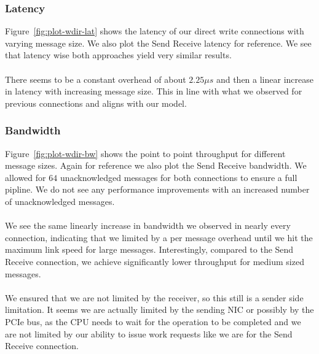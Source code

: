 \subsubsection{Latency}

Figure~\ref{fig:plot-wdir-lat} shows the latency of our direct write connections with varying message size. We
also plot the Send Receive latency for reference. We see that latency wise both approaches yield very similar results.

\paragraph{} There seems to be a constant overhead of about $2.25 \mu s$ and then a linear increase in latency with 
increasing message size. This in line with what we observed for previous connections and aligns with our model.

\subsubsection{Bandwidth}

Figure~\ref{fig:plot-wdir-bw} shows the point to point throughput for different message sizes. Again for reference we also
plot the Send Receive bandwidth. We allowed for $64$ unacknowledged messages for both connections to ensure a full pipline.
We do not see any performance improvements with an increased number of unacknowledged messages.

\paragraph{} We see the same linearly increase in bandwidth we observed in nearly every connection, indicating that we limited
by a per message overhead until we hit the maximum link speed for large messages. Interestingly, compared to the Send Receive
connection, we achieve significantly lower throughput for medium sized messages. 

\paragraph{} We ensured that we are not limited by the receiver, so this still is a sender side limitation. It seems we are
actually limited by the sending NIC or possibly by the PCIe bus, as the CPU needs to wait for the operation to be completed 
and we are not limited by our ability to issue work requests like we are for the Send Receive connection.

